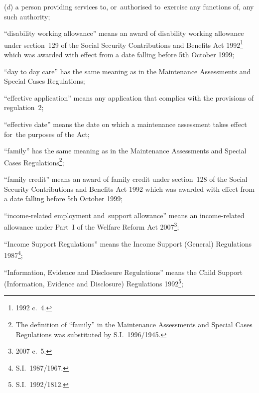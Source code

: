 \documentclass[a4paper,12pt]{article}
\begin{document}
\begin{enumerate}
\begin{enumerate}
    ($d$) 
    a person providing services to, or~authorised to~exercise any functions of, any such authority;
\end{enumerate}



“disability working allowance” means an award of disability working allowance under section~129 of the Social Security Contributions and Benefits Act 1992\footnote{1992 c.\ 4.} which was awarded with effect from a date falling before 5th October 1999;

“day to day care” has the same meaning as in the Maintenance Assessments and Special Cases Regulations;

“effective application” means any application that complies with the provisions of regulation~2;

“effective date” means the date on which a maintenance assessment takes effect for~the purposes of the Act;

“family” has the same meaning as in the Maintenance Assessments and Special Cases Regulations\footnote{The definition of “family” in the Maintenance Assessments and Special Cases Regulations was substituted by S.I.~1996/1945.};

“family credit” means an award of family credit under section~128 of the Social Security Contributions and Benefits Act 1992 which was awarded with effect from a date falling before 5th October 1999;

“income-related employment and~support allowance” means an income-related allowance under Part~I of the Welfare Reform Act 2007\footnote{2007 c.~5.};

“Income Support Regulations” means the Income Support (General) Regulations 1987\footnote{\frenchspacing S.I.~1987/1967.};

“Information, Evidence and Disclosure Regulations” means the Child Support (Information, Evidence and Disclosure) Regulations 1992\footnote{\frenchspacing S.I.~1992/1812.};


\end{enumerate}
\end{document}
